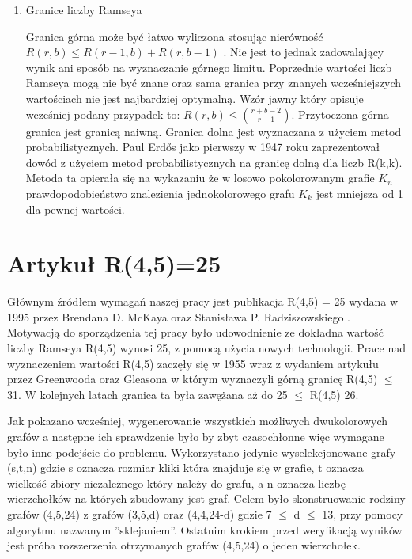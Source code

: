 \documentclass[11pt]{article}
\begin{document}
\begin{enumerate}
\item Granice liczby Ramseya \hfill \par

Granica górna może być łatwo wyliczona stosując nierówność $R(r,b) \le R(r-1,b)+R(r,b-1)$ \cite{graniceupdown} . Nie jest to jednak zadowalający wynik ani sposób na wyznaczanie górnego limitu. Poprzednie wartości liczb Ramseya mogą nie być znane oraz sama granica przy znanych wcześniejszych wartościach nie jest najbardziej optymalną. Wzór jawny który opisuje wcześniej podany przypadek to: $R(r,b) \le {r+b-2\choose r-1}$. Przytoczona górna granica jest granicą naiwną. Granica dolna jest wyznaczana z użyciem metod probabilistycznych. Paul Erdős jako pierwszy w 1947 roku zaprezentował dowód z użyciem metod probabilistycznych na granicę dolną dla liczb R(k,k)\cite{erdogranica, graniceupdown}. Metoda ta opierała się na wykazaniu że w losowo pokolorowanym grafie $\mathit{K}_{n}$ prawdopodobieństwo znalezienia jednokolorowego grafu $\mathit{K}_{k}$ jest mniejsza od 1 dla pewnej wartości.

\end{enumerate}

\section{Artykuł R(4,5)=25}


Głównym źródłem wymagań naszej pracy jest publikacja R(4,5) = 25 wydana w 1995 przez Brendana D. McKaya oraz Stanisława P. Radziszowskiego  \cite{mainpaper} . Motywacją do sporządzenia tej pracy było udowodnienie ze dokładna wartość liczby Ramseya R(4,5) wynosi 25, z pomocą użycia nowych technologii. Prace nad wyznaczeniem wartości R(4,5) zaczęły się w 1955 wraz z wydaniem artykułu przez Greenwooda oraz Gleasona w którym wyznaczyli górną granicę R(4,5) $\leq$ 31. W kolejnych latach granica ta była zawężana aż do 25 $\leq$ R(4,5)  26.\par
Jak pokazano wcześniej, wygenerowanie wszystkich możliwych dwukolorowych grafów a następne ich sprawdzenie było by zbyt czasochłonne więc wymagane było inne podejście do problemu. Wykorzystano jedynie wyselekcjonowane grafy (s,t,n) gdzie s oznacza rozmiar kliki która znajduje się w grafie, t oznacza wielkość zbiory niezależnego który należy do grafu, a n oznacza liczbę wierzchołków na których zbudowany jest graf. Celem było skonstruowanie rodziny grafów (4,5,24) z grafów (3,5,d) oraz (4,4,24-d) gdzie 7 $\leq$ d $\leq$ 13, przy pomocy algorytmu nazwanym ''sklejaniem''. Ostatnim krokiem przed weryfikacją wyników jest próba rozszerzenia otrzymanych grafów (4,5,24) o jeden wierzchołek.
\end{document}
